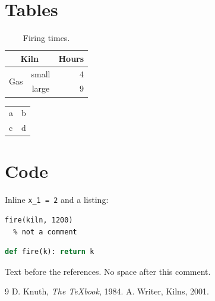 \documentclass{article}
\theoremstyle{definition}
\begin{document}
\section{Tables}

\begin{table}[htbp]
  \centering
  \caption{Firing times.}\label{tab:times}
  \begin{tabular}{|l|c|r|}
    \hline
    \multicolumn{2}{|c|}{Kiln} & Hours \\
    \hline
    \multirow{2}{*}{Gas} & small & 4 \\
     & large & 9 \\
    \hline
  \end{tabular}
\end{table}

\begin{tabular}{ll}
  a & b \\ %
  c & d \\
\end{tabular}

\section{Code}

Inline \verb|x_1 = 2| and a listing:

\begin{verbatim}
fire(kiln, 1200)
  % not a comment
\end{verbatim}

\begin{lstlisting}[language=Python]
def fire(k): return k
\end{lstlisting}




Text before the references.%
No space after this comment.

\begin{thebibliography}{9}
 D. Knuth, \emph{The TeXbook}, 1984.
 A. Writer, Kilns, 2001.
\end{thebibliography}
\end{document}
